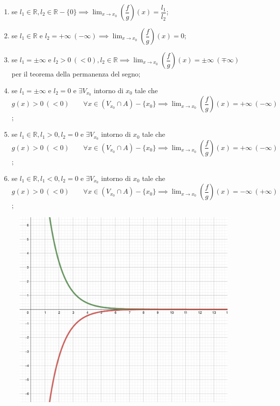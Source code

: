 \documentclass{article}
\begin{document}
 \begin{enumerate}[label=\alph{enumi})]
    \item se $l_1 \in \mathbb{R}, l_2 \in \mathbb{R} - \{0\} \implies \lim_{x \to x_0} \left(\dfrac{f}{g}\right)(x) = \dfrac{l_1}{l_2}$;
    \item se $l_1 \in \mathbb{R}$ e $l_2 = +\infty \ (- \infty) \implies \lim_{x \to x_0} \left(\dfrac{f}{g}\right)(x) = 0$;
    \item se $l_1 = \pm \infty$ e $l_2 > 0 \ (< 0), l_2 \in \mathbb{R} \implies \lim_{x \to x_0} \left(\dfrac{f}{g}\right)(x) = \pm \infty \ (\mp \infty)$ per il teorema della permanenza del segno;
    \item se $l_1 = \pm \infty$ e $l_2 = 0$ e $\exists V_{x_0}$ intorno di $x_0$ tale che $g(x) > 0 \ (< 0) \qquad \forall x \in (V_{x_0} \cap A) - \{x_0\} \implies \lim_{x \to x_0} \left(\dfrac{f}{g}\right)(x) = + \infty \ (- \infty)$;
    \item se $l_1 \in \mathbb{R}, l_1 > 0, l_2 = 0$ e $\exists V_{x_0}$ intorno di $x_0$ tale che $g(x) > 0 \ (< 0) \qquad \forall x \in (V_{x_0} \cap A) - \{x_0\} \implies \lim_{x \to x_0} \left(\dfrac{f}{g}\right)(x) = + \infty \ (- \infty)$;
    \item se $l_1 \in \mathbb{R}, l_1 < 0, l_2 = 0$ e $\exists V_{x_0}$ intorno di $x_0$ tale che $g(x) > 0 \ (< 0) \qquad \forall x \in (V_{x_0} \cap A) - \{x_0\} \implies \lim_{x \to x_0} \left(\dfrac{f}{g}\right)(x) = - \infty \ (+ \infty)$;
\end{enumerate}

\begin{figure}
\includegraphics[width=1\linewidth]{./images/ratioLimits.png} 
\end{figure}
\end{document}
